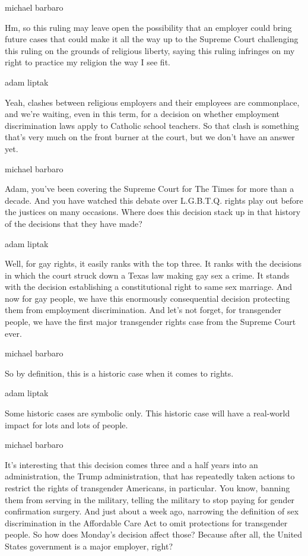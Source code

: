 michael barbaro

Hm, so this ruling may leave open the possibility that an employer could
bring future cases that could make it all the way up to the Supreme
Court challenging this ruling on the grounds of religious liberty,
saying this ruling infringes on my right to practice my religion the way
I see fit.

adam liptak

Yeah, clashes between religious employers and their employees are
commonplace, and we're waiting, even in this term, for a decision on
whether employment discrimination laws apply to Catholic school
teachers. So that clash is something that's very much on the front
burner at the court, but we don't have an answer yet.

michael barbaro

Adam, you've been covering the Supreme Court for The Times for more than
a decade. And you have watched this debate over L.G.B.T.Q. rights play
out before the justices on many occasions. Where does this decision
stack up in that history of the decisions that they have made?

adam liptak

Well, for gay rights, it easily ranks with the top three. It ranks with
the decisions in which the court struck down a Texas law making gay sex
a crime. It stands with the decision establishing a constitutional right
to same sex marriage. And now for gay people, we have this enormously
consequential decision protecting them from employment discrimination.
And let's not forget, for transgender people, we have the first major
transgender rights case from the Supreme Court ever.

michael barbaro

So by definition, this is a historic case when it comes to rights.

adam liptak

Some historic cases are symbolic only. This historic case will have a
real-world impact for lots and lots of people.

michael barbaro

It's interesting that this decision comes three and a half years into an
administration, the Trump administration, that has repeatedly taken
actions to restrict the rights of transgender Americans, in particular.
You know, banning them from serving in the military, telling the
military to stop paying for gender confirmation surgery. And just about
a week ago, narrowing the definition of sex discrimination in the
Affordable Care Act to omit protections for transgender people. So how
does Monday's decision affect those? Because after all, the United
States government is a major employer, right?

